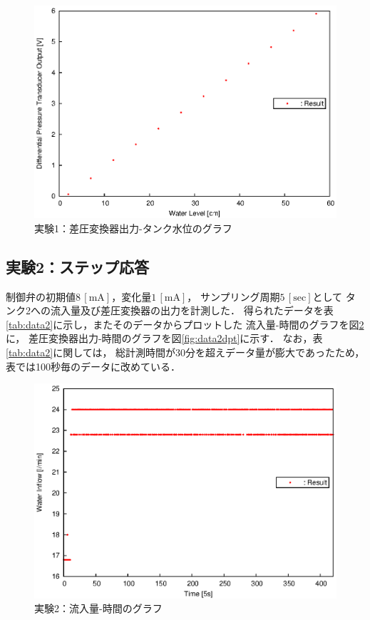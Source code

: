\documentclass[11pt,a4paper]{jsarticle}
\begin{document}
    
    
    \begin{figure}[b]
      \begin{center}
        \includegraphics[width=0.9\hsize]{./fig/data1.eps}
      \end{center}
      \caption{実験1：差圧変換器出力-タンク水位のグラフ}
      \label{fig:data1}
    \end{figure}
  
  \subsection{実験2：ステップ応答}
    制御弁の初期値$8 \,\mathrm{[mA]}$，変化量$1 \,\mathrm{[mA]}$，
    サンプリング周期$5 \,\mathrm{[sec]}$として
    タンク2への流入量及び差圧変換器の出力を計測した．
    得られたデータを表\ref{tab:data2}に示し，またそのデータからプロットした
    流入量-時間のグラフを図\ref{fig:data2inflow}に，
    差圧変換器出力-時間のグラフを図\ref{fig:data2dpt}に示す．
    なお，表\ref{tab:data2}に関しては，
    総計測時間が30分を超えデータ量が膨大であったため，
    表では100秒毎のデータに改めている．
    
    
    
    \begin{figure}[b]
      \begin{center}
        \includegraphics[width=0.9\hsize]{./fig/data2inflow.eps}
      \end{center}
      \caption{実験2：流入量-時間のグラフ}
      \label{fig:data2inflow}
    \end{figure}
    
\end{document}
